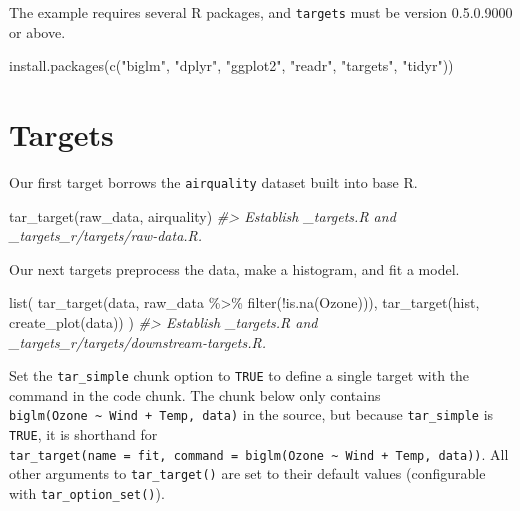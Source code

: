 \documentclass[
]{book}
\newenvironment{Shaded}{\begin{snugshade}}{\end{snugshade}}
\newcommand{\CommentTok}[1]{\textcolor[rgb]{0.56,0.35,0.01}{\textit{#1}}}
\newcommand{\FunctionTok}[1]{\textcolor[rgb]{0.00,0.00,0.00}{#1}}
\newcommand{\NormalTok}[1]{#1}
\newcommand{\SpecialCharTok}[1]{\textcolor[rgb]{0.00,0.00,0.00}{#1}}
\newcommand{\StringTok}[1]{\textcolor[rgb]{0.31,0.60,0.02}{#1}}
\begin{document}
The example requires several R packages, and \texttt{targets} must be version 0.5.0.9000 or above.

\begin{Shaded}
\begin{Highlighting}[]
\FunctionTok{install.packages}\NormalTok{(}\FunctionTok{c}\NormalTok{(}\StringTok{"biglm"}\NormalTok{, }\StringTok{"dplyr"}\NormalTok{, }\StringTok{"ggplot2"}\NormalTok{, }\StringTok{"readr"}\NormalTok{, }\StringTok{"targets"}\NormalTok{, }\StringTok{"tidyr"}\NormalTok{))}
\end{Highlighting}
\end{Shaded}

\hypertarget{targets}{%
\section{Targets}\label{targets}}

Our first target borrows the \texttt{airquality} dataset built into base R.

\begin{Shaded}
\begin{Highlighting}[]
\FunctionTok{tar\_target}\NormalTok{(raw\_data, airquality)}
\CommentTok{\#\textgreater{} Establish \_targets.R and \_targets\_r/targets/raw{-}data.R.}
\end{Highlighting}
\end{Shaded}

Our next targets preprocess the data, make a histogram, and fit a model.

\begin{Shaded}
\begin{Highlighting}[]
\FunctionTok{list}\NormalTok{(}
  \FunctionTok{tar\_target}\NormalTok{(data, raw\_data }\SpecialCharTok{\%\textgreater{}\%} \FunctionTok{filter}\NormalTok{(}\SpecialCharTok{!}\FunctionTok{is.na}\NormalTok{(Ozone))),}
  \FunctionTok{tar\_target}\NormalTok{(hist, }\FunctionTok{create\_plot}\NormalTok{(data))}
\NormalTok{)}
\CommentTok{\#\textgreater{} Establish \_targets.R and \_targets\_r/targets/downstream{-}targets.R.}
\end{Highlighting}
\end{Shaded}

Set the \texttt{tar\_simple} chunk option to \texttt{TRUE} to define a single target with the command in the code chunk. The chunk below only contains \texttt{biglm(Ozone\ \textasciitilde{}\ Wind\ +\ Temp,\ data)} in the source, but because \texttt{tar\_simple} is \texttt{TRUE}, it is shorthand for \texttt{tar\_target(name\ =\ fit,\ command\ =\ biglm(Ozone\ \textasciitilde{}\ Wind\ +\ Temp,\ data))}. All other arguments to \texttt{tar\_target()} are set to their default values (configurable with \texttt{tar\_option\_set()}).
\end{document}
